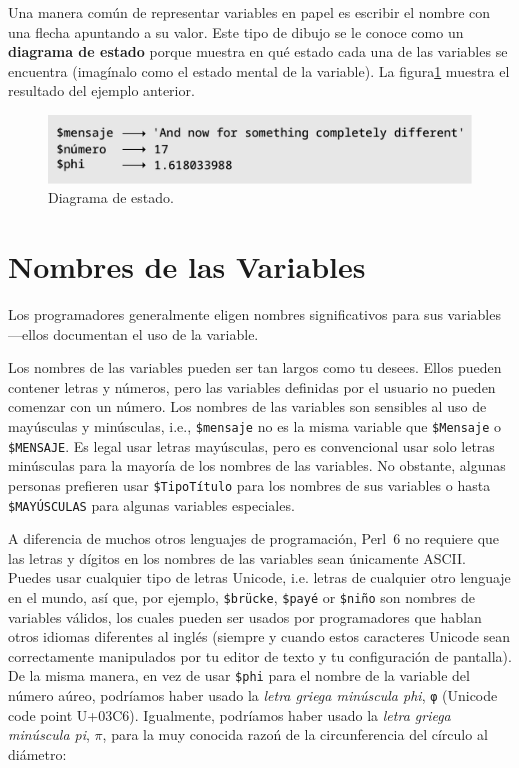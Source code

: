 
Una manera común de representar variables en papel es escribir el 
nombre con una flecha apuntando a su valor. Este tipo de dibujo se le conoce
como un {\bf diagrama de estado} porque muestra en qué estado cada una de las variables
se encuentra (imagínalo como el estado mental de la variable).
La figura\ref{fig.state2} muestra el resultado del ejemplo anterior.

\begin{figure}
\centerline
{\includegraphics[scale=0.6]{figs/test_5.pdf}}
\caption{Diagrama de estado.}
\label{fig.state2}
\end{figure}



\section{Nombres de las Variables}

Los programadores generalmente eligen nombres significativos
para sus variables---ellos documentan el uso de la variable.

Los nombres de las variables pueden ser tan largos como tu desees.
Ellos pueden contener letras y números, pero las variables
definidas por el usuario no pueden comenzar con un número. Los nombres de las
variables son sensibles al uso de mayúsculas y minúsculas, 
i.e., {\tt \$mensaje} no es la misma variable que {\tt \$Mensaje} 
o {\tt \$MENSAJE}. Es legal usar letras mayúsculas, pero es convencional
usar solo letras minúsculas para la mayoría de los nombres de las
variables. No obstante, algunas personas prefieren usar {\tt \$TipoTítulo}
para los nombres de sus variables o hasta {\tt \$MAYÚSCULAS} 
para algunas variables especiales.


A diferencia de muchos otros lenguajes de programación, Perl~6 
no requiere que las letras y dígitos en los nombres de las variables
sean únicamente ASCII. Puedes usar cualquier tipo de letras Unicode, i.e.
letras de cualquier otro lenguaje en el mundo, así que, por ejemplo,
{\tt \$brücke}, {\tt \$payé} or {\tt \$niño} son nombres de variables
válidos, los cuales pueden ser usados por programadores que hablan 
otros idiomas diferentes al inglés (siempre y cuando estos caracteres
Unicode sean correctamente manipulados por tu editor de texto y tu
configuración de pantalla). De la misma manera, en vez de usar 
\verb"$phi" para el nombre de la variable del número aúreo,
podríamos haber usado la \emph{letra griega minúscula phi},
\verb'φ' (Unicode code point U+03C6). Igualmente, podríamos
haber usado la \emph{letra griega minúscula pi}, $\pi$, 
para la muy conocida razoń de la circunferencia del círculo
al diámetro:

